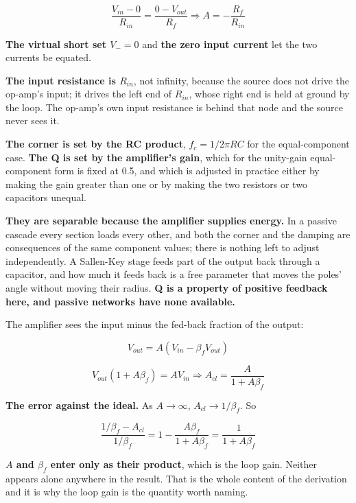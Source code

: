 \[
  \frac{V_{in} - 0}{R_{in}} = \frac{0 - V_{out}}{R_f}
  \Rightarrow \boxed{A = -\frac{R_f}{R_{in}}}
\]

\textbf{The virtual short set $V_- = 0$} and \textbf{the zero input current} let the two currents be equated.

\textbf{The input resistance is $R_{in}$}, not infinity, because the source does not drive the op-amp's input; it drives the left end of $R_{in}$, whose right end is held at ground by the loop. The op-amp's own input resistance is behind that node and the source never sees it.


\textbf{The corner is set by the RC product}, $f_c = 1/2\pi RC$ for the equal-component case. \textbf{The Q is set by the amplifier's gain}, which for the unity-gain equal-component form is fixed at 0.5, and which is adjusted in practice either by making the gain greater than one or by making the two resistors or two capacitors unequal.

\textbf{They are separable because the amplifier supplies energy.} In a passive cascade every section loads every other, and both the corner and the damping are consequences of the same component values; there is nothing left to adjust independently. A Sallen-Key stage feeds part of the output back through a capacitor, and how much it feeds back is a free parameter that moves the poles' angle without moving their radius. \textbf{Q is a property of positive feedback here, and passive networks have none available.}



The amplifier sees the input minus the fed-back fraction of the output:

\[
  V_{out} = A\left(V_{in} - \beta_f V_{out}\right)
\]

\[
  V_{out}(1 + A\beta_f) = A V_{in} \Rightarrow \boxed{A_{cl} = \frac{A}{1 + A\beta_f}}
\]

\textbf{The error against the ideal.} As $A \to \infty$, $A_{cl} \to 1/\beta_f$. So

\[
  \frac{1/\beta_f - A_{cl}}{1/\beta_f} = 1 - \frac{A\beta_f}{1 + A\beta_f}
  = \boxed{\frac{1}{1 + A\beta_f}}
\]

\textbf{$A$ and $\beta_f$ enter only as their product}, which is the loop gain. Neither appears alone anywhere in the result. That is the whole content of the derivation and it is why the loop gain is the quantity worth naming.

